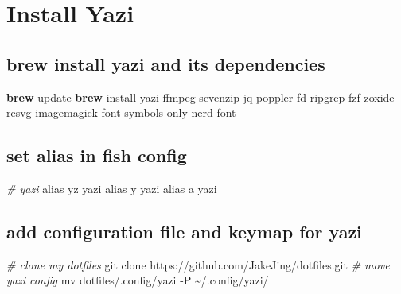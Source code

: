 \documentclass[
  letterpaper,
  DIV=11,
  numbers=noendperiod]{scrartcl}
\newenvironment{Shaded}{}{}
\newcommand{\AttributeTok}[1]{\textcolor[rgb]{0.65,0.15,0.64}{#1}}
\newcommand{\BuiltInTok}[1]{\textcolor[rgb]{0.65,0.15,0.64}{#1}}
\newcommand{\CommentTok}[1]{\textcolor[rgb]{0.63,0.63,0.65}{\textit{#1}}}
\newcommand{\ExtensionTok}[1]{\textcolor[rgb]{0.25,0.47,0.95}{\textbf{#1}}}
\newcommand{\FunctionTok}[1]{\textcolor[rgb]{0.25,0.47,0.95}{#1}}
\newcommand{\NormalTok}[1]{\textcolor[rgb]{0.22,0.23,0.26}{#1}}
\begin{document}
\section{Install Yazi}\label{install-yazi}

\subsection{brew install yazi and its
dependencies}\label{brew-install-yazi-and-its-dependencies}

\begin{Shaded}
\begin{Highlighting}[]
\ExtensionTok{brew}\NormalTok{ update}
\ExtensionTok{brew}\NormalTok{ install yazi ffmpeg sevenzip jq poppler fd ripgrep fzf zoxide resvg imagemagick font{-}symbols{-}only{-}nerd{-}font}
\end{Highlighting}
\end{Shaded}

\subsection{set alias in fish config}\label{set-alias-in-fish-config}

\begin{Shaded}
\begin{Highlighting}[]
\CommentTok{\# yazi}
\BuiltInTok{alias}\NormalTok{ yz yazi}
\BuiltInTok{alias}\NormalTok{ y yazi}
\BuiltInTok{alias}\NormalTok{ a yazi}
\end{Highlighting}
\end{Shaded}

\subsection{add configuration file and keymap for
yazi}\label{add-configuration-file-and-keymap-for-yazi}

\begin{Shaded}
\begin{Highlighting}[]
\CommentTok{\# clone my dotfiles}
\FunctionTok{git}\NormalTok{ clone https://github.com/JakeJing/dotfiles.git}
\CommentTok{\# move yazi config}
\FunctionTok{mv}\NormalTok{ dotfiles/.config/yazi }\AttributeTok{{-}P}\NormalTok{ \textasciitilde{}/.config/yazi/}
\end{Highlighting}
\end{Shaded}
\end{document}
